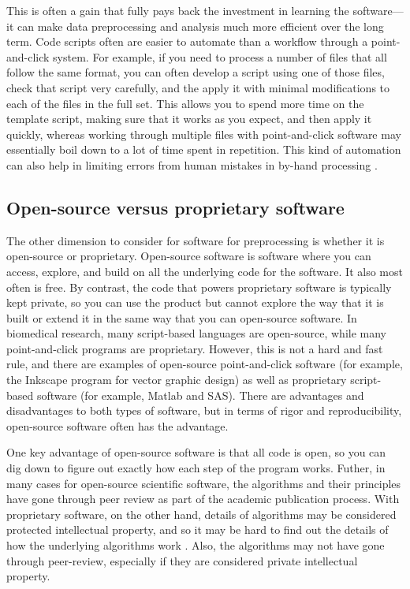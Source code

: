 \documentclass[]{tufte-book}
\begin{document}
This is often a gain that fully pays back the investment in learning the
software---it can make data preprocessing and analysis much more efficient over
the long term. Code scripts often are easier to automate than a workflow through
a point-and-click system. For example, if you need to process a number of files
that all follow the same format, you can often develop a script using one of
those files, check that script very carefully, and the apply it with minimal
modifications to each of the files in the full set. This allows you to spend
more time on the template script, making sure that it works as you expect, and
then apply it quickly, whereas working through multiple files with
point-and-click software may essentially boil down to a lot of time spent in
repetition. This kind of automation can also help in limiting errors from human
mistakes in by-hand processing \citep{gibb2014reproducibility}.

\subsection{Open-source versus proprietary software}\label{open-source-versus-proprietary-software}

The other dimension to consider for software for preprocessing is whether it is
open-source or proprietary. Open-source software is software where you can
access, explore, and build on all the underlying code for the software. It also
most often is free. By contrast, the code that powers proprietary software is
typically kept private, so you can use the product but cannot explore the way
that it is built or extend it in the same way that you can open-source software.
In biomedical research, many script-based languages are open-source, while many
point-and-click programs are proprietary. However, this is not a hard and fast
rule, and there are examples of open-source point-and-click software (for
example, the Inkscape program for vector graphic design) as well as proprietary
script-based software (for example, Matlab and SAS). There are advantages and
disadvantages to both types of software, but in terms of rigor and
reproducibility, open-source software often has the advantage.

One key advantage of open-source software is that all code is open, so you can
dig down to figure out exactly how each step of the program works. Futher, in
many cases for open-source scientific software, the algorithms and their
principles have gone through peer review as part of the academic publication
process. With proprietary software, on the other hand, details of algorithms may
be considered protected intellectual property, and so it may be hard to find out
the details of how the underlying algorithms work \citep{nekrutenko2012next}. Also,
the algorithms may not have gone through peer-review, especially if they are
considered private intellectual property.
\end{document}
